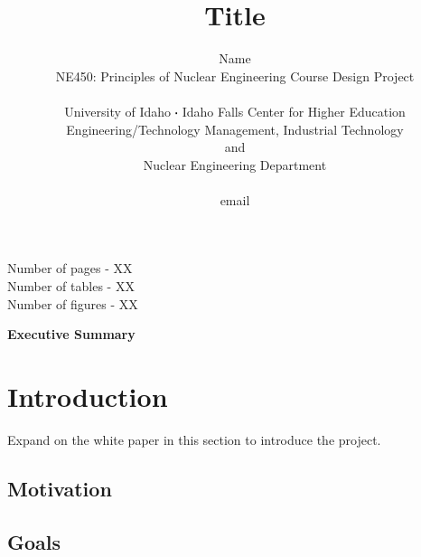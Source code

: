 \documentclass[11pt,a4paper]{article} \usepackage[lmargin=1in,rmargin=1in,tmargin=1in,bmargin=1in]{geometry} \usepackage[pagewise]{lineno} %
\newcommand*\sq{\mathbin{\vcenter{\hbox{\rule{.3ex}{.3ex}}}}} %
\begin{document}
\begin{titlepage}
    \title{Title}
    \author{
        Name \\
        NE450: Principles of Nuclear Engineering Course Design Project
        \\ \\
        University of Idaho $\sq$ Idaho Falls Center for Higher Education\\[0.05in]
        Engineering/Technology Management, Industrial Technology\\and\\Nuclear Engineering Department
        \\ \\
        email
    }
\clearpage %
\maketitle
\vspace*{\fill}
\begin{flushright}{
        \noindent Number of pages - XX \\
        \noindent Number of tables - XX \\
        \noindent Number of figures - XX
}
\end{flushright}
\thispagestyle{empty} %
\end{titlepage}

\onehalfspacing
\linenumbers
\pagewiselinenumbers
\modulolinenumbers[3] %

\noindent\Large{\textbf{Executive Summary}} \label{exec-summ} \\

\newpage

\section{Introduction} \label{introduction}
Expand on the white paper in this section to introduce the project.

\subsection{Motivation}

\subsection{Goals}

\newpage
\end{document}
